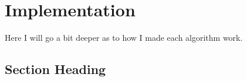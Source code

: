 \chapter{Implementation}


Here I will go a bit deeper as to how I made each algorithm work.

\section{Section Heading}
